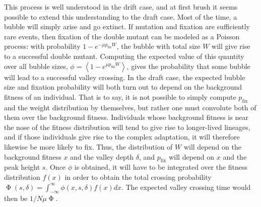 \documentclass[10pt,twocolumn,twoside]{gsajnl}
\newcommand{\pfix}{p_{\mathrm{fix}}}
\begin{document}
\begin{spacing}{1.5}
This process is well understood in the drift case, and at first brush it seems possible to extend this understanding to the draft case.
Most of the time, a bubble will simply arise and go extinct.
If mutation and fixation are sufficiently rare events, then fixation of the double mutant can be modeled as a Poisson process: with probability $1-e^{-\mu \pfix W}$, the bubble with total size $W$ will give rise to a successful double mutant.
Computing the expected value of this quantity over all bubble sizes, $\phi = \left< 1-e^{\mu \pfix W} \right>$, gives the probability that some bubble will lead to a successful valley crossing.
In the draft case, the expected bubble size and fixation probability will both turn out to depend on the background fitness of an individual.
That is to say, it is not possible to simply compute $\pfix$ and the weight distribution by themselves, but rather one must convolute both of them over the background fitness.
Individuals whose background fitness is near the nose of the fitness distribution will tend to give rise to longer-lived lineages, and if those individuals give rise to the complex adaptation, it will therefore likewise be more likely to fix.
Thus, the distribution of $W$ will depend on the background fitness $x$ and the valley depth $\delta$, and $\pfix$ will depend on $x$ and the peak height $s$.
Once $\phi$ is obtained, it will have to be integrated over the fitness distribution $f(x)$ in order to obtain the total crossing probability $\upPhi(s,\delta) = \int_{-\infty}^\infty \phi(x,s,\delta) f(x) dx$.
The expected valley crossing time would then be $1/N\mu\upPhi$.


\end{spacing}
\end{document}
